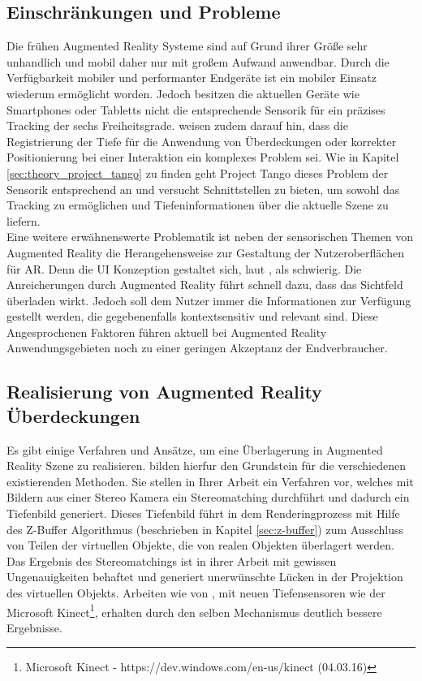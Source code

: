 \subsection{Einschränkungen und Probleme}

Die frühen Augmented Reality Systeme sind auf Grund ihrer Größe sehr unhandlich und mobil daher nur mit großem Aufwand anwendbar. Durch die Verfügbarkeit mobiler und performanter Endgeräte ist ein mobiler Einsatz wiederum ermöglicht worden. Jedoch besitzen die aktuellen Geräte wie Smartphones oder Tabletts nicht die entsprechende Sensorik für ein präzises Tracking der sechs Freiheitsgrade. \citet{van2010survey} weisen zudem darauf hin, dass die Registrierung der Tiefe für die Anwendung von Überdeckungen oder korrekter Positionierung bei einer Interaktion ein komplexes Problem sei. Wie in Kapitel \ref{sec:theory_project_tango} zu finden geht Project Tango dieses Problem der Sensorik entsprechend an und versucht Schnittstellen zu bieten, um sowohl das Tracking zu ermöglichen und Tiefeninformationen über die aktuelle Szene zu liefern. \\

Eine weitere erwähnenswerte Problematik ist neben der sensorischen Themen von Augmented Reality die Herangehensweise zur Gestaltung der Nutzeroberflächen für AR. Denn die UI Konzeption gestaltet sich, laut \citet{azuma2001recent}, als schwierig. Die Anreicherungen durch Augmented Reality führt schnell dazu, dass das Sichtfeld überladen wirkt. Jedoch soll dem Nutzer immer die Informationen zur Verfügung gestellt werden, die gegebenenfalls kontextsensitiv und relevant sind. Diese Angesprochenen Faktoren führen aktuell bei Augmented Reality Anwendungsgebieten noch zu einer geringen Akzeptanz der Endverbraucher.\\

\subsection{Realisierung von Augmented Reality Über\-deckungen} \label{sec:ar-occlusion}

Es gibt einige Verfahren und Ansätze, um eine Überlagerung in Augmented Reality Szene zu realisieren. \citet{wloka1995resolving} bilden hierfur den Grundstein für die verschiedenen existierenden Methoden. Sie stellen in Ihrer Arbeit ein Verfahren vor, welches mit Bildern aus einer Stereo Kamera ein Stereomatching durchführt und dadurch ein Tiefenbild generiert. Dieses Tiefenbild führt in dem Renderingprozess mit Hilfe des Z-Buffer Algorithmus (beschrieben in Kapitel \ref{sec:z-buffer}) zum Ausschluss von Teilen der virtuellen Objekte, die von realen Objekten überlagert werden. Das Ergebnis des Stereomatchings ist in ihrer Arbeit mit gewissen Ungenauigkeiten behaftet und generiert unerwünschte Lücken in der Projektion des virtuellen Objekts. Arbeiten wie von \citet{seo2013direct}, mit neuen Tiefensensoren wie der Microsoft Kinect\footnote{Microsoft Kinect - https://dev.windows.com/en-us/kinect (04.03.16)}, erhalten durch den selben Mechanismus deutlich bessere Ergebnisse. \\

